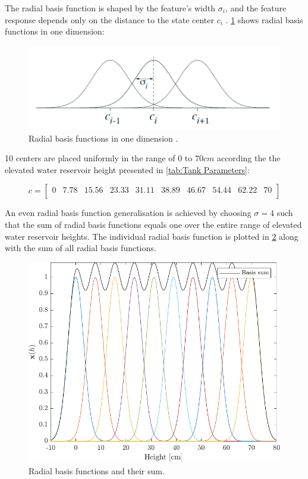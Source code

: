 The radial basis function is shaped by the feature's width $ \sigma_{i} $, and the feature response depends only on the distance to the state center $ c_{i} $ \cite{Sutton2020}. \cref{fig:RBF1D} shows radial basis functions in one dimension:

\begin{figure}[h!]
	\centering
	\includegraphics[width=0.8\linewidth]{Figures/RBF.pdf}
	\caption{Radial basis functions in one dimension \cite{Sutton2020}.}
	\label{fig:RBF1D}
\end{figure}

10 centers are placed uniformly in the range of $ 0 $ to $ 70\si{cm} $ according the the elevated water reservoir height presented in \cref{tab:Tank Parameters}:

\begin{equation*}
	c = \begin{bmatrix}
		0 & 7.78  & 15.56 &  23.33 &  31.11 &  38.89 &  46.67 &  54.44  & 62.22  & 70\\
	\end{bmatrix}
\end{equation*}

An even radial basis function generalisation is achieved by choosing $\sigma = 4$ such that the sum of radial basis functions equals one over the entire range of elevated water reservoir heights. The individual radial basis function is plotted in \cref{fig:RadialSum} along with the sum of all radial basis functions. 

\begin{figure}[h!]
	\centering
	\includegraphics[width=0.7\linewidth]{Figures/RadialSum.pdf}
	\caption{Radial basis functions and their sum.}
	\label{fig:RadialSum}
\end{figure}

